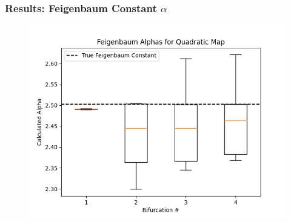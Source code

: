 \documentclass[
	11pt, %
	aspectratio=169, %
]{beamer}
\begin{document}

\begin{frame}
        \frametitle{Results: Feigenbaum Constant $\alpha$}
        \begin{figure}
            \includegraphics[width=0.6\linewidth]
            {quadratic_feigenbaum_alphas.png}
        \end{figure}
\end{frame}

\end{document}
